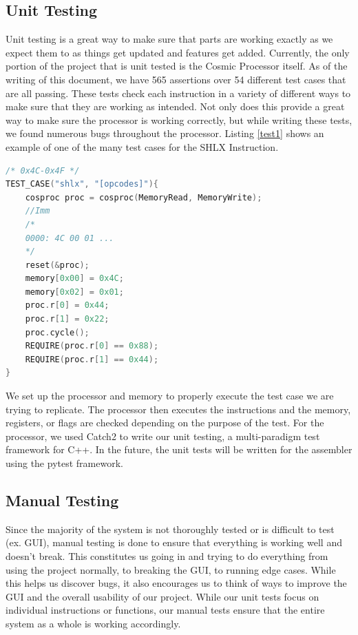 \documentclass[conference]{IEEEtran}
\begin{document}
\subsection{Unit Testing}
Unit testing is a great way to make sure that parts are working exactly as we expect them to as things get updated and features get added. Currently, the only portion of the project that is unit tested is the Cosmic Processor itself. As of the writing of this document, we have 565 assertions over 54 different test cases that are all passing. These tests check each instruction in a variety of different ways to make sure that they are working as intended. Not only does this provide a great way to make sure the processor is working correctly, but while writing these tests, we found numerous bugs throughout the processor. Listing \ref{test1} shows an example of one of the many test cases for the SHLX Instruction. 
\begin{lstlisting}[language={C++}, caption={A unit test for the SHLX instruction.}, label = {test1}]
/* 0x4C-0x4F */
TEST_CASE("shlx", "[opcodes]"){
    cosproc proc = cosproc(MemoryRead, MemoryWrite);
    //Imm
    /*
    0000: 4C 00 01 ...
    */
    reset(&proc);
    memory[0x00] = 0x4C;
    memory[0x02] = 0x01;
    proc.r[0] = 0x44;
    proc.r[1] = 0x22;
    proc.cycle();
    REQUIRE(proc.r[0] == 0x88);
    REQUIRE(proc.r[1] == 0x44);
}
\end{lstlisting}

We set up the processor and memory to properly execute the test case we are trying to replicate. The processor then executes the instructions and the memory, registers, or flags are checked depending on the purpose of the test. For the processor, we used Catch2\cite{b3} to write our unit testing, a multi-paradigm test framework for C++. In the future, the unit tests will be written for the assembler using the pytest\cite{b4} framework.

\subsection{Manual Testing}
Since the majority of the system is not thoroughly tested or is difficult to test (ex. GUI), manual testing is done to ensure that everything is working well and doesn't break. This constitutes us going in and trying to do everything from using the project normally, to breaking the GUI, to running edge cases. While this helps us discover bugs, it also encourages us to think of ways to improve the GUI and the overall usability of our project. While our unit tests focus on individual instructions or functions, our manual tests ensure that the entire system as a whole is working accordingly.
\end{document}
